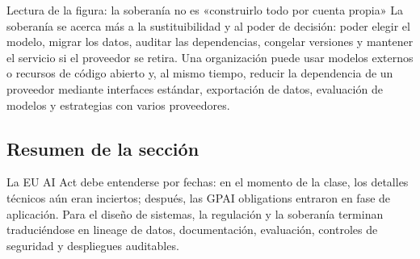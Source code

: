 
\begin{knowledgebox}{Lectura de la figura: la soberanía no es «construirlo todo por cuenta propia»}
La soberanía se acerca más a la sustituibilidad y al poder de decisión: poder elegir el modelo, migrar los datos, auditar las dependencias, congelar versiones y mantener el servicio si el proveedor se retira. Una organización puede usar modelos externos o recursos de código abierto y, al mismo tiempo, reducir la dependencia de un proveedor mediante interfaces estándar, exportación de datos, evaluación de modelos y estrategias con varios proveedores.
\end{knowledgebox}


\subsection{Resumen de la sección}

La EU AI Act debe entenderse por fechas: en el momento de la clase, los detalles técnicos aún eran inciertos; después, las GPAI obligations entraron en fase de aplicación. Para el diseño de sistemas, la regulación y la soberanía terminan traduciéndose en lineage de datos, documentación, evaluación, controles de seguridad y despliegues auditables.

